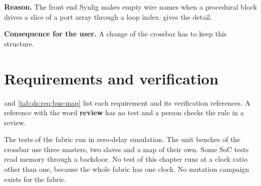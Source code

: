 \textbf{Reason.} The front end Synlig makes empty wire names when a procedural block drives a slice of a port array through a loop index.  gives the detail.

\textbf{Consequence for the user.} A change of the crossbar has to keep this structure.

\section{Requirements and verification}\label{ds:ch:mod-bus-fabric:map}
 and \cref{tab:ds:req:bus-map} list each requirement and its verification references. A reference with the word \textbf{review} has no test and a person checks the rule in a review.

The tests of the fabric run in zero-delay simulation. The unit benches of the crossbar use three masters, two slaves and a map of their own. Some SoC tests read memory through a backdoor. No test of this chapter runs at a clock ratio other than one, because the whole fabric has one clock. No mutation campaign exists for the fabric.




